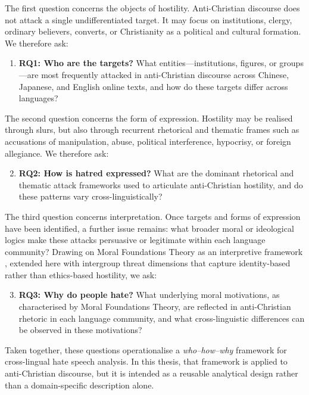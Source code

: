 \documentclass[../CLthesis.tex]{subfiles}
\begin{document}
The first question concerns the objects of hostility. Anti-Christian discourse does not attack a single undifferentiated target. It may focus on institutions, clergy, ordinary believers, converts, or Christianity as a political and cultural formation. We therefore ask:

\begin{enumerate}
    \item \textbf{RQ1: Who are the targets?} What entities---institutions, figures, or groups---are most frequently attacked in anti-Christian discourse across Chinese, Japanese, and English online texts, and how do these targets differ across languages?
\end{enumerate}

The second question concerns the form of expression. Hostility may be realised through slurs, but also through recurrent rhetorical and thematic frames such as accusations of manipulation, abuse, political interference, hypocrisy, or foreign allegiance. We therefore ask:

\begin{enumerate}
    \setcounter{enumi}{1}
    \item \textbf{RQ2: How is hatred expressed?} What are the dominant rhetorical and thematic attack frameworks used to articulate anti-Christian hostility, and do these patterns vary cross-linguistically?
\end{enumerate}

The third question concerns interpretation. Once targets and forms of expression have been identified, a further issue remains: what broader moral or ideological logics make these attacks persuasive or legitimate within each language community? Drawing on Moral Foundations Theory as an interpretive framework \citep{haidt2012righteous, graham_liberals_2009}, extended here with intergroup threat dimensions that capture identity-based rather than ethics-based hostility, we ask:

\begin{enumerate}
    \setcounter{enumi}{2}
    \item \textbf{RQ3: Why do people hate?} What underlying moral motivations, as characterised by Moral Foundations Theory, are reflected in anti-Christian rhetoric in each language community, and what cross-linguistic differences can be observed in these motivations?
\end{enumerate}

Taken together, these questions operationalise a \emph{who--how--why} framework for cross-lingual hate speech analysis. In this thesis, that framework is applied to anti-Christian discourse, but it is intended as a reusable analytical design rather than a domain-specific description alone.
\end{document}
